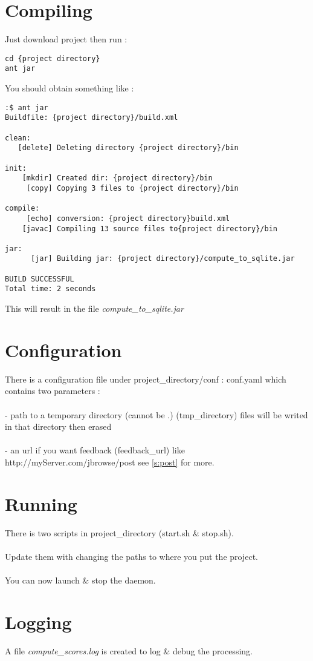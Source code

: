 \documentclass[11pt]{report}
\begin{document}
\section{Compiling}\label{s:compile}
Just download project then run :
\begin{verbatim}
cd {project directory}
ant jar
\end{verbatim}
You should obtain something like :
\begin{verbatim}
:$ ant jar
Buildfile: {project directory}/build.xml

clean:
   [delete] Deleting directory {project directory}/bin

init:
    [mkdir] Created dir: {project directory}/bin
     [copy] Copying 3 files to {project directory}/bin

compile:
     [echo] conversion: {project directory}build.xml
    [javac] Compiling 13 source files to{project directory}/bin

jar:
      [jar] Building jar: {project directory}/compute_to_sqlite.jar

BUILD SUCCESSFUL
Total time: 2 seconds
\end{verbatim}
This will result in the file \textit{compute\_to\_sqlite.jar}


\section{Configuration}\label{s:configuration}
There is a configuration file under project\_directory/conf : conf.yaml
which contains two parameters :  \\\\
- path to a temporary directory (cannot be .)
	(tmp\_directory)  files will be writed in that directory then erased
	\\\\
- an url if you want feedback (feedback\_url) like http://myServer.com/jbrowse/post
see \ref{s:post} for more.

\section{Running}\label{s:running}
There is two scripts in project\_directory (start.sh \& stop.sh).\\\\
Update them with changing the paths to where you put the project.\\\\
You can now launch \& stop the daemon.
\section{Logging}\label{s:loggin}
A file \textit{compute\_scores.log} is created to log \& debug the processing.
\end{document}
